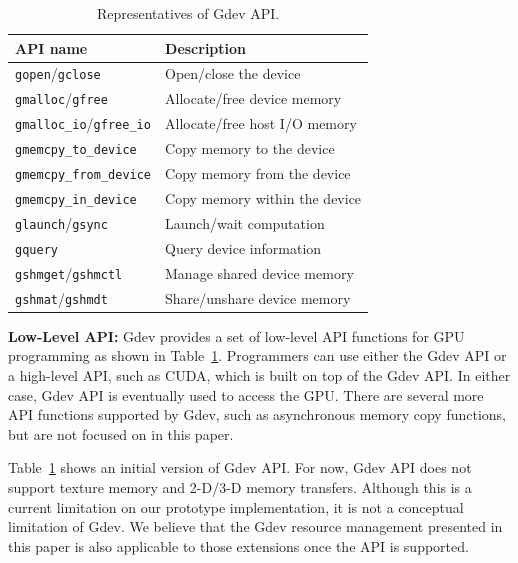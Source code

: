 \begin{table}[t]
 \caption{Representatives of Gdev API.}
 \vspace{-1em}
 \label{tab:gdev_api}
 \begin{center}
  {\small
  \begin{tabular}{|l|l|}
   \hline
   \textbf{API name} & \textbf{Description}\\
   \hline
   \texttt{gopen}/\texttt{gclose} & Open/close the device\\
   \hline
   \texttt{gmalloc}/\texttt{gfree} & Allocate/free device memory\\
   \hline
   \texttt{gmalloc\_io}/\texttt{gfree\_io} & Allocate/free host I/O memory\\
   \hline
   \texttt{gmemcpy\_to\_device} & Copy memory to the device\\
   \hline
   \texttt{gmemcpy\_from\_device} & Copy memory from the device\\
   \hline
   \texttt{gmemcpy\_in\_device} & Copy memory within the device\\
   \hline
   \texttt{glaunch}/\texttt{gsync} & Launch/wait computation\\
   \hline
   \texttt{gquery} & Query device information\\
   \hline
   \texttt{gshmget}/\texttt{gshmctl} & Manage shared device memory\\
   \hline
   \texttt{gshmat}/\texttt{gshmdt} & Share/unshare device memory\\
   \hline
  \end{tabular}
  }
 \end{center}
\vspace{-1em}
\end{table}

\textbf{Low-Level API:}
Gdev provides a set of low-level API functions for GPU programming as
shown in Table~\ref{tab:gdev_api}.
Programmers can use either the Gdev API or a high-level API, such as
CUDA, which is built on top of the Gdev API.
In either case, Gdev API is eventually used to access the GPU.
There are several more API functions supported by Gdev, such as
asynchronous memory copy functions, but are not focused on in this
paper.

Table~\ref{tab:gdev_api} shows an initial version of Gdev API.
For now, Gdev API does not support texture memory and 2-D/3-D memory
transfers.
Although this is a current limitation on our prototype implementation,
it is not a conceptual limitation of Gdev.
We believe that the Gdev resource management presented in this paper is
also applicable to those extensions once the API is supported.

